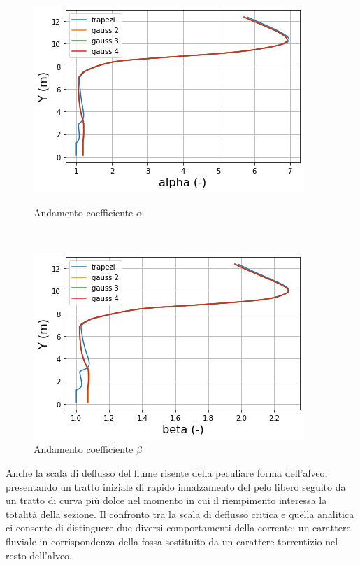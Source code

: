 \documentclass[12pt]{article} %
\begin{document}
\begin{figure}[H]
\begin{minipage}[b]{8.5cm}
\centering
    \includegraphics[width=1 \textwidth]{alphata.png}
    \caption{Andamento coefficiente $\alpha$}
    \label{fig:Tanaro_alfa}
\end{minipage}
\ \hspace{2mm} \hspace{3mm} \
\begin{minipage}[b]{8.5cm}
    \centering
    \includegraphics[width=1 \textwidth]{betata.png}
    \caption{Andamento coefficiente $\beta$}
    \label{fig:Tanaro_beta}
\end{minipage}
\end{figure}

\noindent Anche la scala di deflusso del fiume risente della peculiare forma dell’alveo, presentando un tratto iniziale di rapido innalzamento del pelo libero seguito da un tratto di curva più dolce nel momento in cui il riempimento interessa la totalità della sezione. Il confronto tra la scala di deflusso critica e quella analitica ci consente di distinguere due diversi comportamenti della corrente: un carattere fluviale in corrispondenza della fossa sostituito da un carattere torrentizio nel resto dell’alveo.
\end{document}
